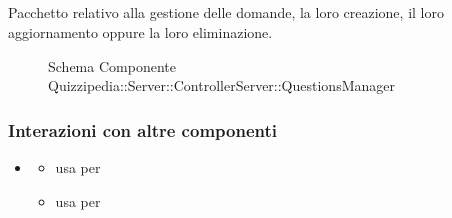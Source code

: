 \subsection{}
Pacchetto relativo alla gestione delle domande, la loro creazione, il loro aggiornamento oppure la loro eliminazione.
\begin{figure}[H]
\centering
\noindent{}
\caption[Schema Componente Quizzipedia::Server::ControllerServer::QuestionsManager]{Schema Componente Quizzipedia::Server::ControllerServer::QuestionsManager}
\end{figure}
\subsubsection{Interazioni con altre componenti}
\begin{itemize}
\item {}
\begin{itemize}
\item usa  per 
\item usa  per 
\end{itemize}
\end{itemize}
